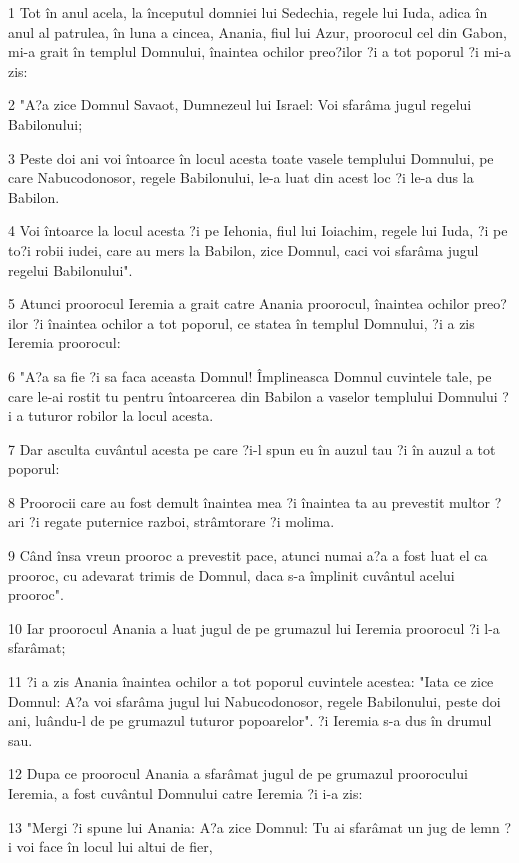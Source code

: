 \par 1 Tot în anul acela, la începutul domniei lui Sedechia, regele lui Iuda, adica în anul al patrulea, în luna a cincea, Anania, fiul lui Azur, proorocul cel din Gabon, mi-a grait în templul Domnului, înaintea ochilor preo?ilor ?i a tot poporul ?i mi-a zis:
\par 2 "A?a zice Domnul Savaot, Dumnezeul lui Israel: Voi sfarâma jugul regelui Babilonului;
\par 3 Peste doi ani voi întoarce în locul acesta toate vasele templului Domnului, pe care Nabucodonosor, regele Babilonului, le-a luat din acest loc ?i le-a dus la Babilon.
\par 4 Voi întoarce la locul acesta ?i pe Iehonia, fiul lui Ioiachim, regele lui Iuda, ?i pe to?i robii iudei, care au mers la Babilon, zice Domnul, caci voi sfarâma jugul regelui Babilonului".
\par 5 Atunci proorocul Ieremia a grait catre Anania proorocul, înaintea ochilor preo?ilor ?i înaintea ochilor a tot poporul, ce statea în templul Domnului, ?i a zis Ieremia proorocul:
\par 6 "A?a sa fie ?i sa faca aceasta Domnul! Împlineasca Domnul cuvintele tale, pe care le-ai rostit tu pentru întoarcerea din Babilon a vaselor templului Domnului ?i a tuturor robilor la locul acesta.
\par 7 Dar asculta cuvântul acesta pe care ?i-l spun eu în auzul tau ?i în auzul a tot poporul:
\par 8 Proorocii care au fost demult înaintea mea ?i înaintea ta au prevestit multor ?ari ?i regate puternice razboi, strâmtorare ?i molima.
\par 9 Când însa vreun prooroc a prevestit pace, atunci numai a?a a fost luat el ca prooroc, cu adevarat trimis de Domnul, daca s-a împlinit cuvântul acelui prooroc".
\par 10 Iar proorocul Anania a luat jugul de pe grumazul lui Ieremia proorocul ?i l-a sfarâmat;
\par 11 ?i a zis Anania înaintea ochilor a tot poporul cuvintele acestea: "Iata ce zice Domnul: A?a voi sfarâma jugul lui Nabucodonosor, regele Babilonului, peste doi ani, luându-l de pe grumazul tuturor popoarelor". ?i Ieremia s-a dus în drumul sau.
\par 12 Dupa ce proorocul Anania a sfarâmat jugul de pe grumazul proorocului Ieremia, a fost cuvântul Domnului catre Ieremia ?i i-a zis:
\par 13 "Mergi ?i spune lui Anania: A?a zice Domnul: Tu ai sfarâmat un jug de lemn ?i voi face în locul lui altui de fier,
